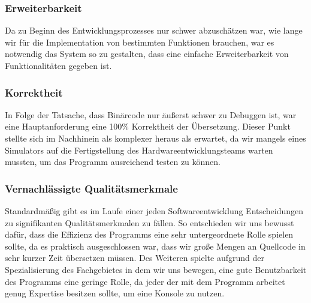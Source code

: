 \documentclass[paper=a4,fontsize=12pt,twocolumn]{scrreprt}
\begin{document}
\subsubsection{Erweiterbarkeit}
Da zu Beginn des Entwicklungsprozesses nur schwer abzuschätzen war, wie lange wir für die Implementation von bestimmten Funktionen brauchen, war es notwendig das System so zu gestalten, dass eine einfache Erweiterbarkeit von Funktionalitäten gegeben ist.

\subsubsection{Korrektheit}
In Folge der Tatsache, dass Binärcode nur äußerst schwer zu Debuggen ist, war eine Hauptanforderung eine 100\% Korrektheit der Übersetzung.
Dieser Punkt stellte sich im Nachhinein als komplexer heraus als erwartet, da wir mangels eines Simulators auf die Fertigstellung des Hardwareentwicklungsteams warten mussten, um das Programm ausreichend testen zu können.

\subsubsection{Vernachlässigte Qualitätsmerkmale}
Standardmäßig gibt es im Laufe einer jeden Softwareentwicklung Entscheidungen zu signifikanten Qualitätsmerkmalen zu fällen.
So entschieden wir uns bewusst dafür, dass die Effizienz des Programms eine sehr untergeordnete Rolle spielen sollte, da es praktisch ausgeschlossen war, dass wir große Mengen an Quellcode in sehr kurzer Zeit übersetzen müssen. 
Des Weiteren spielte aufgrund der Spezialisierung des Fachgebietes in dem wir uns bewegen, eine gute Benutzbarkeit des Programms eine geringe Rolle, da jeder der mit dem Programm arbeitet genug Expertise besitzen sollte, um eine Konsole zu nutzen.
\end{document}
